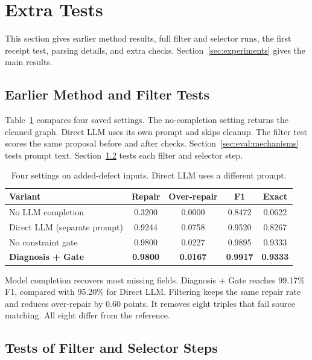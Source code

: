 \section{Extra Tests}
\label{app:historical_diagnostics}

This section gives earlier method results, full filter and selector runs,
the first receipt test, parsing details, and extra checks.
Section~\ref{sec:experiments} gives the main results.

\subsection{Earlier Method and Filter Tests}
\label{sec:eval:ablation}

Table~\ref{tab:repair_ablation} compares four saved settings.
The no-completion setting returns the cleaned graph.
Direct LLM uses its own prompt and skips cleanup.
The filter test scores the same proposal before and after checks.
Section~\ref{sec:eval:mechanisms} tests prompt text.
Section~\ref{sec:eval:individual_ablation} tests each filter and selector step.

\begin{table}[t]
\centering
\caption{Four settings on added-defect inputs. Direct LLM uses a different prompt.}
\label{tab:repair_ablation}
\small
\begin{tabular}{l c c c c}
\toprule
Variant & Repair & Over-repair & F1 & Exact \\
\midrule
No LLM completion & 0.3200 & 0.0000 & 0.8472 & 0.0622 \\
Direct LLM (separate prompt) & 0.9244 & 0.0758 & 0.9520 & 0.8267 \\
No constraint gate & 0.9800 & 0.0227 & 0.9895 & 0.9333 \\
\textbf{Diagnosis + Gate} & \textbf{0.9800} & \textbf{0.0167} & \textbf{0.9917} & \textbf{0.9333} \\
\bottomrule
\end{tabular}
\end{table}

Model completion recovers most missing fields.
Diagnosis + Gate reaches 99.17\% F1, compared with 95.20\% for Direct LLM.
Filtering keeps the same repair rate and reduces over-repair by 0.60 points.
It removes eight triples that fail source matching.
All eight differ from the reference.

\subsection{Tests of Filter and Selector Steps}
\label{sec:eval:individual_ablation}

